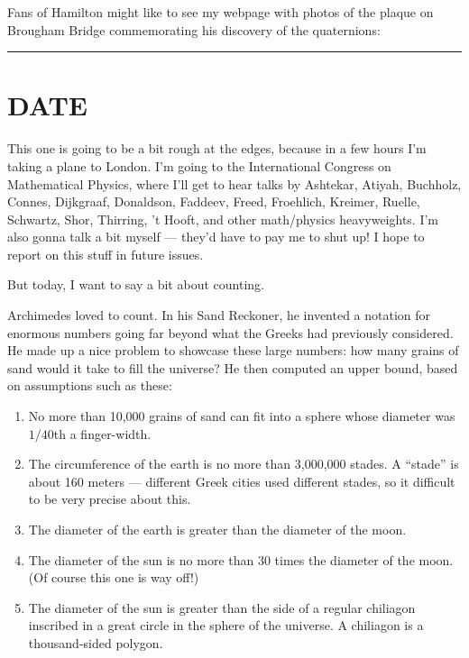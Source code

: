 \documentclass{article}
\def\tightlist{}
\renewcommand{\texttt}[1]{%
  \begingroup
  \ttfamily
  \begingroup\lccode`~=`/\lowercase{\endgroup\def~}{/\discretionary{}{}{}}%
  \begingroup\lccode`~=`[\lowercase{\endgroup\def~}{[\discretionary{}{}{}}%
  \begingroup\lccode`~=`.\lowercase{\endgroup\def~}{.\discretionary{}{}{}}%
  \catcode`/=\active\catcode`[=\active\catcode`.=\active
  \scantokens{#1\noexpand}%
  \endgroup
}
\begin{document}
Fans of Hamilton might like to see my webpage with photos of the plaque
on Brougham Bridge commemorating his discovery of the quaternions:


\begin{center}\rule{0.5\linewidth}{0.5pt}\end{center}
\hypertarget{week153}{%
\section{DATE}\label{week153}}

This one is going to be a bit rough at the edges, because in a few hours
I'm taking a plane to London. I'm going to the International Congress on
Mathematical Physics, where I'll get to hear talks by Ashtekar, Atiyah,
Buchholz, Connes, Dijkgraaf, Donaldson, Faddeev, Freed, Froehlich,
Kreimer, Ruelle, Schwartz, Shor, Thirring, 't Hooft, and other
math/physics heavyweights. I'm also gonna talk a bit myself --- they'd
have to pay me to shut up! I hope to report on this stuff in future
issues.

But today, I want to say a bit about counting.

Archimedes loved to count. In his Sand Reckoner, he invented a notation
for enormous numbers going far beyond what the Greeks had previously
considered. He made up a nice problem to showcase these large numbers:
how many grains of sand would it take to fill the universe? He then
computed an upper bound, based on assumptions such as these:

\begin{enumerate}
\def\labelenumi{\Alph{enumi})}
\item
  No more than 10,000 grains of sand can fit into a sphere whose
  diameter was \(1/40\)th a finger-width.
\item
  The circumference of the earth is no more than 3,000,000 stades. A
  ``stade'' is about 160 meters --- different Greek cities used
  different stades, so it difficult to be very precise about this.
\item
  The diameter of the earth is greater than the diameter of the moon.
\item
  The diameter of the sun is no more than 30 times the diameter of the
  moon. (Of course this one is way off!)
\item
  The diameter of the sun is greater than the side of a regular
  chiliagon inscribed in a great circle in the sphere of the universe. A
  chiliagon is a thousand-sided polygon.
\end{enumerate}
\end{document}
